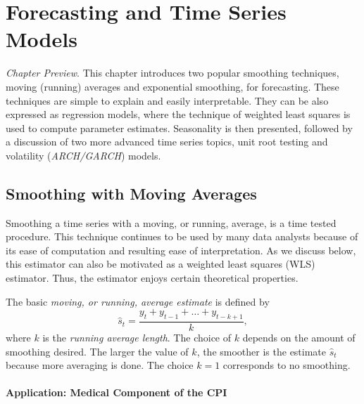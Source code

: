 \setcounter{chapter}{8}
\chapter{Forecasting and Time Series Models}
{\small \textit{Chapter Preview}.  This chapter introduces two
popular smoothing techniques, moving (running) averages and
exponential smoothing, for forecasting. These techniques are simple
to explain and easily interpretable. They can be also expressed as
regression models, where the technique of weighted least squares is
used to compute parameter estimates. Seasonality is then presented,
followed by a discussion of two more advanced time series topics,
unit root testing and volatility (\textit{ARCH/GARCH}) models.}


\section{Smoothing with Moving Averages}


Smoothing a time series with a moving, or running, average, is a
time tested procedure. This technique continues to be used by many
data analysts because of its ease of computation and resulting ease
of interpretation. As we discuss below, this estimator can also be
motivated as a weighted least squares (WLS) estimator. Thus, the
estimator enjoys certain theoretical properties.

The basic \emph{moving, or running, average estimate} is defined by
\begin{equation}\label{E9:MovingAverage1}
\widehat{s}_t = \frac{y_t + y_{t-1} + \ldots + y_{t-k+1}}{k} ,
\end{equation}
where $k$ is the \emph{running average length}. The choice of $k$
depends on the amount of smoothing desired. The larger the value of
$k$, the smoother is the estimate $\widehat{s}_t$ because more
averaging is done. The choice $k=1$ corresponds to no
smoothing.


\subsubsection*{Application: Medical Component of the CPI}

